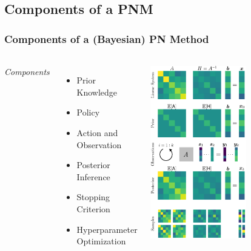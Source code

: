 \documentclass[10pt,usepdftitle=false,aspectratio=169]{beamer}
\begin{document}
\begin{frame}
\begin{columns}
{\begin{tikzpicture}[
				x=0.75pt,
				y=0.75pt,
				yscale=-1,
				xscale=1,
			]
		\end{tikzpicture}
		}

	\end{columns}

	\vspace{1.8em}


\end{frame}

\subsection{Components of a PNM}

\begin{frame}\frametitle{Components of a (Bayesian) PN Method}
	\framesubtitle{}

	\begin{columns}[c,totalwidth=\textwidth]

		\emph{Components}
		\begin{itemize}
			\item Prior Knowledge
			\item Policy
			\item Action and Observation
			\item Posterior Inference
			\item Stopping Criterion
			\item Hyperparameter Optimization

		\end{itemize}

		\centering
		\includegraphics[width=0.6\textwidth]{figures/problinsolve.pdf}


\end{columns}
\end{frame}
\end{document}
